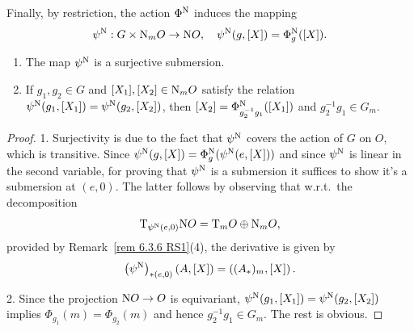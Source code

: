Finally, by restriction, the action $\Phi^{\mathrm{N}}$ induces the mapping
\[\psi^{\mathrm{N}}:G\times \mathrm{N}_mO\to \mathrm{N} O,\quad \psi^{\mathrm{N}}(g,[X])=\Phi^{\mathrm{N}}_g([X]).\label{eq 6.4.4 RS1}\]

\begin{lem}[{{\cite[Lem.~6.4.6]{RS1}}}]\label{lem 6.4.6 RS1}
    \begin{enumerate}
        \item The map $\psi^{\mathrm{N}}$ is a surjective submersion.
        \item If $g_1,g_2\in G$ and $[X_1],[X_2]\in \mathrm{N}_mO$ satisfy the relation $\psi^{\mathrm{N}}(g_1,[X_1])=\psi^{\mathrm{N}}(g_2,[X_2])$, then $[X_2]=\Phi^{\mathrm{N}}_{g_2^{-1}g_1}([X_1])$ and $g_2^{-1}g_1\in G_m$.
    \end{enumerate}
\end{lem}
\begin{proof}
    1. Surjectivity is due to the fact that $\psi^{\mathrm{N}}$ covers the action of $G$ on $O$, which is transitive. Since $\psi^{\mathrm{N}}(g,[X])=\Phi^{\mathrm{N}}_g(\psi^{\mathrm{N}}(e,[X]))$ and since $\psi^{\mathrm{N}}$ is linear in the second variable, for proving that $\psi^{\mathrm{N}}$ is a submersion it suffices to show it's a submersion at $(e,0)$. The latter follows by observing that w.r.t.\ the decomposition 
    \[\mathrm{T}_{\psi^{\mathrm{N}}(e,0)}\mathrm{N} O=\mathrm{T}_m O\oplus \mathrm{N}_m O,\]
    provided by Remark~\ref{rem 6.3.6 RS1}(4), the derivative is given by 
    \[\left(\psi^{\mathrm{N}}\right)_{\ast (e,0)}(A,[X])=\left((A_\ast)_m,[X]\right).\]

    2. Since the projection $\mathrm{N} O\to O$ is equivariant, $\psi^{\mathrm{N}}(g_1,[X_1])=\psi^{\mathrm{N}}(g_2,[X_2])$ implies $\Phi_{g_1}(m)=\Phi_{g_2}(m)$ and hence $g_2^{-1}g_1\in G_m$. The rest is obvious.
\end{proof}




